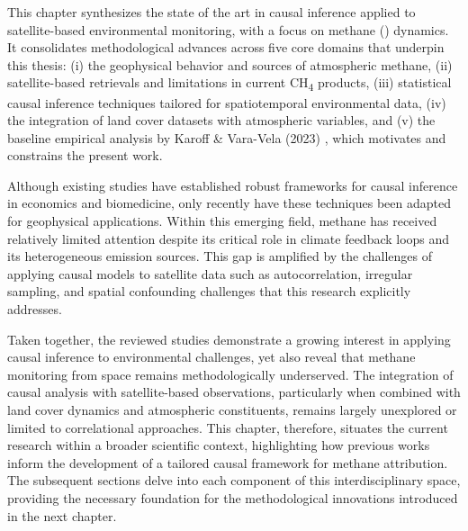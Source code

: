 \cleardoublepage
\label{chap:back}

This chapter synthesizes the state of the art in causal inference applied to satellite-based environmental monitoring, with a focus on methane () dynamics. It consolidates methodological advances across five core domains that underpin this thesis: (i) the geophysical behavior and sources of atmospheric methane, (ii) satellite-based retrievals and limitations in current CH\textsubscript{4} products, (iii) statistical causal inference techniques tailored for spatiotemporal environmental data, (iv) the integration of land cover datasets with atmospheric variables, and (v) the baseline empirical analysis by Karoff \& Vara-Vela (2023) \cite{Karoff2023}, which motivates and constrains the present work.

Although existing studies have established robust frameworks for causal inference in economics and biomedicine, only recently have these techniques been adapted for geophysical applications. Within this emerging field, methane has received relatively limited attention despite its critical role in climate feedback loops and its heterogeneous emission sources. This gap is amplified by the challenges of applying causal models to satellite data such as autocorrelation, irregular sampling, and spatial confounding challenges that this research explicitly addresses.

Taken together, the reviewed studies demonstrate a growing interest in applying causal inference to environmental challenges, yet also reveal that methane monitoring from space remains methodologically underserved. The integration of causal analysis with satellite-based observations, particularly when combined with land cover dynamics and atmospheric constituents, remains largely unexplored or limited to correlational approaches. This chapter, therefore, situates the current research within a broader scientific context, highlighting how previous works inform the development of a tailored causal framework for methane attribution. The subsequent sections delve into each component of this interdisciplinary space, providing the necessary foundation for the methodological innovations introduced in the next chapter.

